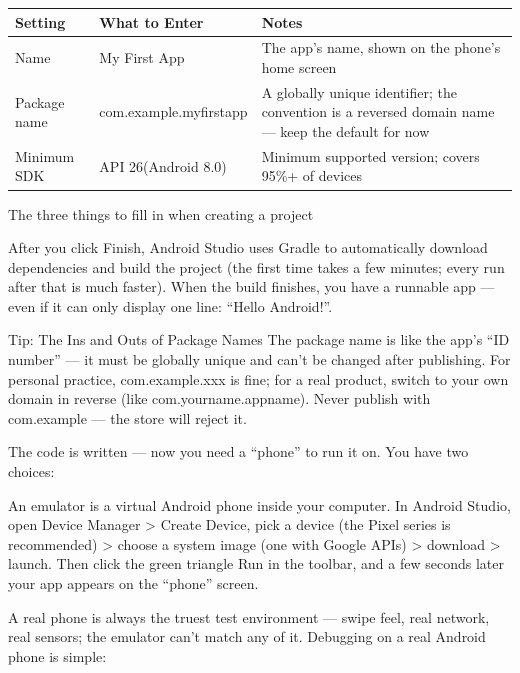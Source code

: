\begin{center}
\begin{tabularx}{\linewidth}{|X|X|X|}
\hline
\textbf{Setting} & \textbf{What to Enter} & \textbf{Notes} \tabularnewline
\hline
Name & My First App & The app's name, shown on the phone's home screen \tabularnewline
Package name & com.example.myfirstapp & A globally unique identifier; the convention is a reversed domain name — keep the default for now \tabularnewline
Minimum SDK & API 26(Android 8.0) & Minimum supported version; covers 95\%+ of devices \tabularnewline
\hline
\end{tabularx}
\end{center}

\begin{center}\small\color{gray}The three things to fill in when creating a project\end{center}

After you click Finish, Android Studio uses Gradle to automatically download dependencies and build the project (the first time takes a few minutes; every run after that is much faster). When the build finishes, you have a runnable app — even if it can only display one line: “Hello Android!”.

\begin{tcbinfo}{Tip: The Ins and Outs of Package Names}
The package name is like the app's “ID number” — it must be globally unique and can't be changed after publishing. For personal practice, com.example.xxx is fine; for a real product, switch to your own domain in reverse (like com.yourname.appname). Never publish with com.example — the store will reject it.

\end{tcbinfo}


The code is written — now you need a “phone” to run it on. You have two choices:


An emulator is a virtual Android phone inside your computer. In Android Studio, open Device Manager > Create Device, pick a device (the Pixel series is recommended) > choose a system image (one with Google APIs) > download > launch. Then click the green triangle Run in the toolbar, and a few seconds later your app appears on the “phone” screen.


A real phone is always the truest test environment — swipe feel, real network, real sensors; the emulator can't match any of it. Debugging on a real Android phone is simple:

